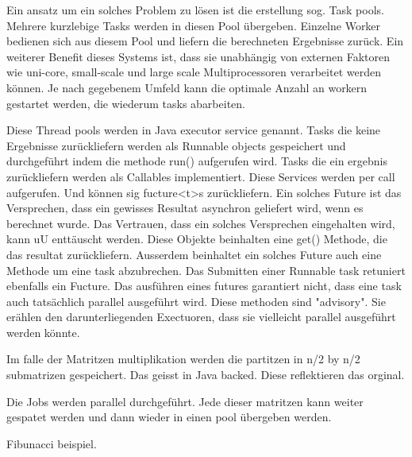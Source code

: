 Ein ansatz um ein solches Problem zu lösen ist die erstellung sog. Task pools. Mehrere kurzlebige Tasks werden in diesen Pool übergeben. Einzelne Worker bedienen sich aus diesem Pool und liefern die berechneten Ergebnisse zurück. Ein weiterer Benefit dieses Systems ist, dass sie unabhängig von externen Faktoren wie uni-core, small-scale und large scale Multiprocessoren verarbeitet werden können. Je nach gegebenem Umfeld kann die optimale Anzahl an workern gestartet werden, die wiederum tasks abarbeiten.

Diese Thread pools werden in Java executor service genannt. Tasks die keine Ergebnisse zurückliefern werden als Runnable objects gespeichert und durchgeführt indem die methode run() aufgerufen wird. Tasks die ein ergebnis zurückliefern werden als Callables implementiert. Diese Services werden per call aufgerufen. Und können sig fucture<t>s zurückliefern. Ein solches Future ist das Versprechen, dass ein gewisses Resultat asynchron geliefert wird, wenn es berechnet wurde. Das Vertrauen, dass ein solches Versprechen eingehalten wird, kann uU enttäuscht werden. Diese Objekte beinhalten eine get() Methode, die das resultat zurückliefern. Ausserdem beinhaltet ein solches Future auch eine Methode um eine task abzubrechen. Das Submitten einer Runnable task retuniert ebenfalls ein Fucture. Das ausführen eines futures garantiert nicht, dass eine task auch tatsächlich parallel ausgeführt wird. Diese methoden sind "advisory". Sie erählen den darunterliegenden Exectuoren, dass sie vielleicht parallel ausgeführt werden könnte.

Im falle der Matritzen multiplikation werden die partitzen in n/2 by n/2 submatrizen gespeichert. Das geisst in Java backed. Diese reflektieren das orginal. 

Die Jobs werden parallel durchgeführt. Jede dieser matritzen kann weiter gespatet werden und dann wieder in einen pool übergeben werden. 


Fibunacci beispiel.


